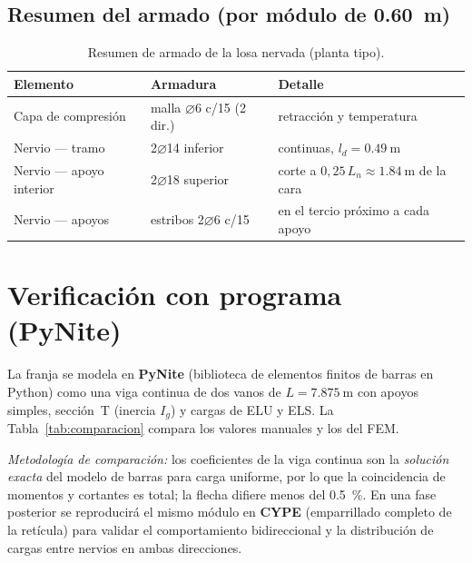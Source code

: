 \subsection{Resumen del armado (por módulo de \SI{0,60}{\meter})}
\begin{table}[H]
\centering
\caption{Resumen de armado de la losa nervada (planta tipo).}
\label{tab:armado}
\begin{tabular}{p{4.2cm}p{4.6cm}p{5.2cm}}
\toprule
\textbf{Elemento} & \textbf{Armadura} & \textbf{Detalle} \\
\midrule
Capa de compresión & malla $\varnothing6$ c/15 (2 dir.) & retracción y temperatura \\
Nervio --- tramo & 2$\varnothing$14 inferior & continuas, $l_d = \SI{0,49}{\meter}$ \\
Nervio --- apoyo interior & 2$\varnothing$18 superior & corte a $0{,}25\,L_n \approx \SI{1,84}{\meter}$ de la cara \\
Nervio --- apoyos & estribos 2$\varnothing$6 c/15 & en el tercio próximo a cada apoyo \\
\bottomrule
\end{tabular}
\end{table}

\section{Verificación con programa (PyNite)}
\label{sec:pynite}

La franja se modela en \textbf{PyNite} (biblioteca de elementos finitos
de barras en Python) como una viga continua de dos vanos de
$L = \SI{7,875}{\meter}$ con apoyos simples, sección~T (inercia
$I_g$) y cargas de ELU y ELS. La Tabla~\ref{tab:comparacion} compara
los valores manuales y los del FEM.

\emph{Metodología de comparación:} los coeficientes de la viga continua
son la \emph{solución exacta} del modelo de barras para carga uniforme,
por lo que la coincidencia de momentos y cortantes es total; la flecha
difiere menos del \SI{0,5}{\percent}. En una fase posterior se
reproducirá el mismo módulo en \textbf{CYPE} (emparrillado completo de
la retícula) para validar el comportamiento bidireccional y la
distribución de cargas entre nervios en ambas direcciones.


